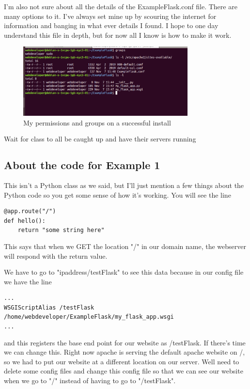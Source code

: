 \documentclass[10pt]{article}
\begin{document}
I'm also not sure about all the details of the ExampleFlask.conf file. There are many options to it. I've always set mine up by scouring the internet for information and banging in what ever details I found. I hope to one day understand this file in depth, but for now all I know is how to make it work.

\begin{figure}[h]
  \centering
    \includegraphics[width=0.8\textwidth]{groupsAndPermissions.png}
  \caption{My permissions and groups on a successful install}
\end{figure}

{\LARGE Wait for class to all be caught up and have their servers running}

\subsection{About the code for Example 1}
This isn't a Python class as we said, but I'll just mention a few things about the Python code so you get some sense of how it's working. You will see the line

\begin{lstlisting}[style=py]
@app.route("/")
def hello():
	return "some string here"
\end{lstlisting}
 
This says that when we GET the location "/" in our domain name, the webserver will respond with the return value.

We have to go to "ipaddress/testFlask" to see this data because in our config file we have the line

\begin{lstlisting}[style=sh]
...
WSGIScriptAlias /testFlask /home/webdeveloper/ExampleFlask/my_flask_app.wsgi
...
\end{lstlisting}

and this registers the base end point for our website as /testFlask. If there's time we can change this. Right now apache is serving the default apache website on /, so we had to put our website at a different location on our server. Well need to delete some config files and change this config file so that we can see our website when we go to "/" instead of having to go to "/testFlask".
\end{document}

